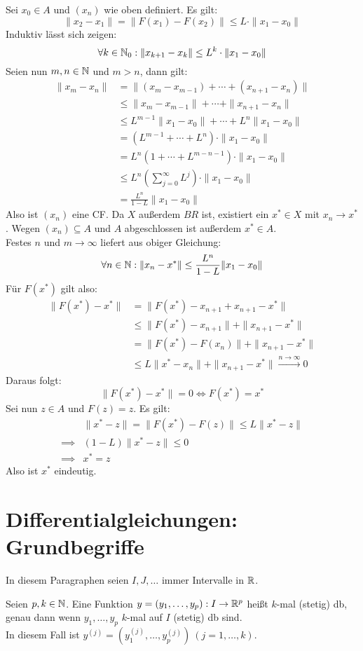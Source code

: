\documentclass[a4paper,twoside,DIV15,BCOR12mm,chapterprefix=true,headings=twolinechapter]{scrbook}
\begin{document}
\begin{beweis}
Sei $x_0\in A$ und $(x_n)$ wie oben definiert. Es gilt:
\[\|x_2-x_1\|=\|F(x_1)-F(x_2)\|\le L\cdot \|x_1-x_0\|\]
Induktiv lässt sich zeigen:
\[\forall k\in\mathbb{N}_0: \|x_{k+1}-x_k\|\le L^k\cdot \|x_1-x_0\|\]
Seien nun $m,n\in\mathbb{N}$ und $m>n$, dann gilt:
\begin{align*}
\|x_m-x_n\| &= \|(x_m-x_{m-1})+\cdots+(x_{n+1}-x_n)\|\\
&\le \|x_m-x_{m-1}\|+\cdots+\|x_{n+1}-x_n\|\\
&\le L^{m-1}\|x_1-x_0\|+\cdots+L^n\|x_1-x_0\|\\
&=(L^{m-1}+\cdots+L^n)\cdot \|x_1-x_0\|\\
&= L^n(1+\cdots+L^{m-n-1})\cdot \|x_1-x_0\|\\
&\le L^n(\sum_{j=0}^\infty L^j)\cdot \|x_1-x_0\|\\
&= \frac{L^n}{1-L}\|x_1-x_0\|
\end{align*}
Also ist $(x_n)$ eine CF. Da $X$ außerdem $BR$ ist, existiert ein $x^*\in X$ mit
$x_n\to x^*$. Wegen $(x_n)\subseteq A$ und $A$ abgeschlossen ist außerdem $x^*\in A$.\\
Festes $n$ und $m\to\infty$ liefert aus obiger Gleichung:
\[\forall n\in\mathbb{N}:\|x_n-x^*\|\le \frac{L^n}{1-L}\|x_1-x_0\|\]
Für $F(x^*)$ gilt also:
\begin{align*}
\|F(x^*)-x^*\| &= \|F(x^*)-x_{n+1}+x_{n+1}-x^*\|\\
&\le \|F(x^*)-x_{n+1}\|+\|x_{n+1}-x^*\|\\
&=\|F(x^*)-F(x_n)\|+\|x_{n+1}-x^*\|\\
&\le L\|x^*-x_n\|+\|x_{n+1}-x^*\|\stackrel{n\to\infty}\to 0
\end{align*}
Daraus folgt:
\[\|F(x^*)-x^*\| = 0\iff F(x^*)=x^*\]
Sei nun $z\in A$ und $F(z)=z$. Es gilt:
\begin{align*}
&\|x^*-z\|=\|F(x^*)-F(z)\| \le L\|x^*-z\|\\
\implies &(1-L)\|x^*-z\| \le 0\\
\implies &x^*=z
\end{align*}
Also ist $x^*$ eindeutig.
\end{beweis}

\chapter{Differentialgleichungen: Grundbegriffe}
In diesem Paragraphen seien $I,J,\ldots$ immer Intervalle in $\mathbb{R}$.

\begin{erinnerung}
Seien $p,k\in\mathbb{N}$. Eine Funktion $y=(y_1,\ldots,y_p):I\to\mathbb{R}^p$ heißt
$k$-mal (stetig) db, genau dann wenn $y_1,\ldots,y_p$ $k$-mal auf $I$ (stetig)
db sind.\\
In diesem Fall ist $y^{(j)}=(y_1^{(j)},\ldots,y_p^{(j)})\ (j=1,\ldots,k)$.
\end{erinnerung}
\end{document}
